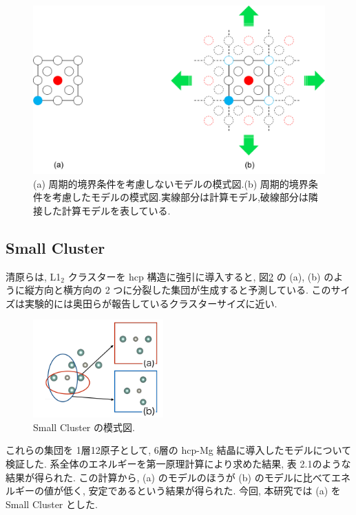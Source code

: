 \begin{figure}[htbp]
	\begin{center}
		\includegraphics[width=130mm]{../method/cnd.png}
		\caption{(a) 周期的境界条件を考慮しないモデルの模式図.(b) 周期的境界条件を考慮したモデルの模式図.実線部分は計算モデル,破線部分は隣接した計算モデルを表している.}
		\label{fig2.1}
	\end{center}
\end{figure}


\subsection{ Small Cluster}

清原らは, L1$_2$ クラスターを hcp 構造に強引に導入すると, 図\ref{fig2.2} の (a), (b) のように縦方向と横方向の 2 つに分裂した集団が生成すると予測している\cite{kiyohara}. このサイズは実験的には奥田らが報告しているクラスターサイズに近い\cite{okuda}. 

\begin{figure}[htbp]
	\begin{center}
		\includegraphics[width=50mm]{../method/MiniCluster.png}
		\caption{Small Cluster の模式図.}
		\label{fig2.2}
	\end{center}
\end{figure}


これらの集団を 1層12原子として, 6層の hcp-Mg 結晶に導入したモデルについて検証した. 系全体のエネルギーを第一原理計算により求めた結果, 表 2.1のような結果が得られた. この計算から, (a) のモデルのほうが (b) のモデルに比べてエネルギーの値が低く, 安定であるという結果が得られた. 今回, 本研究では (a) を Small Cluster とした. 

